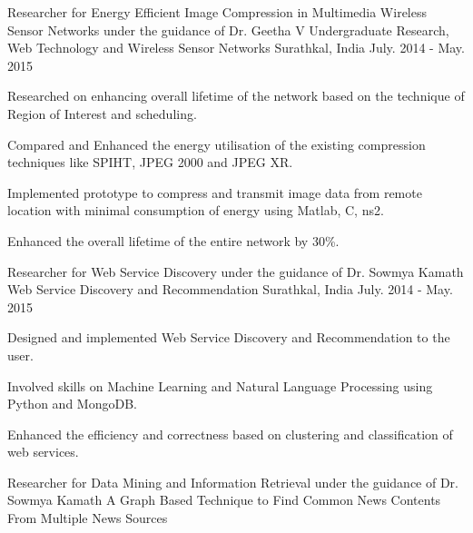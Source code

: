 \begin{cventries}
  \cventry
    {Researcher for Energy Efficient Image Compression in Multimedia Wireless Sensor Networks under the guidance of Dr. Geetha V}
    {Undergraduate Research, Web Technology and Wireless Sensor Networks}
    {Surathkal, India}
    {July. 2014 - May. 2015}
    {
      \begin{cvitems}
        \item {Researched on enhancing overall lifetime of the network based on the technique of Region of Interest and scheduling.}
        \item{Compared and Enhanced the energy utilisation of the existing compression techniques like SPIHT, JPEG 2000 and JPEG XR.}
        \item {Implemented prototype to compress and transmit image data from remote location with minimal consumption of energy using Matlab, C, ns2.}
        \item{Enhanced the overall lifetime of the entire network by 30\%.}
      \end{cvitems} 
    }
    \cventry
    {Researcher for Web Service Discovery under the guidance of Dr. Sowmya Kamath}
    {Web Service Discovery and Recommendation}
    {Surathkal, India}
    {July. 2014 - May. 2015}
    {
      \begin{cvitems}
        \item {Designed and implemented Web Service Discovery and Recommendation to the user.}
        \item{Involved skills on Machine Learning and Natural Language Processing using Python and MongoDB.}
        \item {Enhanced the efficiency and correctness based on clustering and classification of web services.}
      \end{cvitems} 
    }
  \cventry
    {Researcher for Data Mining and Information Retrieval under the guidance of Dr. Sowmya Kamath}
    {A Graph Based Technique to Find Common News Contents From Multiple News Sources}

\end{cventries}
